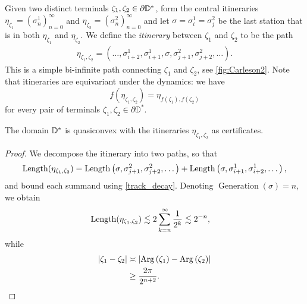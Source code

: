 \begin{definition} \label{def-disk-itinerary} Given two distinct terminals $\zeta_{1},\zeta_{2}\in\partial\mathbb{D}^*$, form the central itineraries $\eta_{\zeta_{1}}=\left(\sigma_{n}^{1}\right)_{n=0}^{\infty}$ and 
	$\eta_{\zeta_{2}}=\left(\sigma_{n}^{2}\right)_{n=0}^{\infty}$
	 and let  $\sigma=\sigma^1_i=\sigma^2_j$ be the last station that is in both $\eta_{\zeta_{1}}$ and $\eta_{\zeta_{2}}$. %
	 We define the \emph{itinerary} between  $\zeta_{1}$ and $\zeta_{2}$ to be the path  %
 \begin{gather*}
 \eta_{\zeta_{1},\zeta_{2}}=  \left(\dots,\sigma_{i+2}^{1},\sigma_{i+1}^{1},\sigma,\sigma_{j+1}^{2},\sigma_{j+2}^{2},\dots\right).
 \end{gather*}
	This is a simple bi-infinite path connecting $\zeta_{1}$ and $\zeta_{2}$, see \cref{fig:Carleson2}. Note that itineraries are equivariant under the dynamics: we have  \begin{equation}
		f(\eta_{\zeta_1,\zeta_2})=\eta_{f(\zeta_1),f(\zeta_2)}
	\end{equation} for every pair of terminals $\zeta_1,\zeta_2 \in \partial \mathbb D^*$.
	
	
\end{definition}


\begin{theorem} \label{quasiconvex disk}
The domain $\mathbb{D}^{*}$ is quasiconvex with the itineraries $\eta_{\zeta_1,\zeta_2}$ as certificates.
\end{theorem}

\begin{proof}
We decompose the itinerary into two paths, so that
\begin{equation}
\operatorname{Length}(\eta_{\zeta_{1},\zeta_{2}})=\operatorname{Length}\left(\sigma,\sigma_{j+1}^{2},\sigma_{j+2}^{2},\dots\right)
+\operatorname{Length}\left(\sigma,\sigma_{i+1}^{1},\sigma_{i+2}^{1},\dots\right),
\end{equation}
and bound each summand using \cref{track_decay}. Denoting $\operatorname{Generation}(\sigma)=n$, we obtain
\begin{align*}
\operatorname{Length}(\eta_{\zeta_{1},\zeta_{2}})
&\lesssim 2 \sum_{k=n}^{\infty}\frac{1}{2^{k}} 
\lesssim2^{-n}, \label{eq:1}
\end{align*}
while 
\begin{align*}
\left|\zeta_{1}-\zeta_{2}\right|
&\asymp
\left|\operatorname{Arg}\left(\zeta_{1}\right)-\operatorname{Arg}\left(\zeta_{2}\right)\right|\\
&\geq \frac {2\pi}{2^{n+2}}.
\end{align*}
\end{proof}


